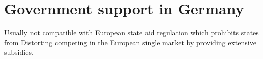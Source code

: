 
\chapter{Government support in Germany} %

\label{ChapterX} %




Usually not compatible with European state aid regulation which prohibits states from Distorting competing in the European single market by providing extensive subsidies. 